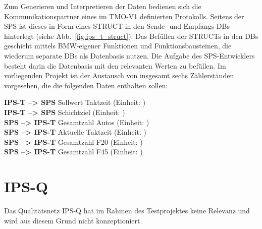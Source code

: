 Zum Generieren und Interpretieren der Daten bedienen sich die Kommunikationspartner eines im TMO-V1 definierten Protokolls. Seitens der SPS ist dieses in Form eines STRUCT in den Sende- und Empfangs-DBs hinterlegt (siehe Abb.~\ref{fig:ips_t_struct}). Das Befüllen der STRUCTs in den DBs geschieht mittels BMW-eigener Funktionen und Funktionsbausteinen, die wiederum separate DBs als Datenbasis nutzen. Die Aufgabe des SPS-Entwicklers besteht darin die Datenbasis mit den relevanten Werten zu befüllen. Im vorliegenden Projekt ist der Austausch von insgesamt sechs Zählerständen vorgesehen, die die folgenden Daten enthalten sollen:

\begin{tabbing}
    \textbf{IPS-T}    \= \textbf{--> SPS}   \hspace{.5cm}\= Sollwert Taktzeit (Einheit: ) \\
    \textbf{IPS-T}    \> \textbf{--> SPS}   \> Schichtziel (Einheit: \einh{}{\cars}) \\
    \textbf{SPS  }    \> \textbf{--> IPS-T} \> Gesamtzahl Autos (Einheit: \einh{}{\cars})\\
    \textbf{SPS  }    \> \textbf{--> IPS-T} \> Aktuelle Taktzeit (Einheit: )\\
    \textbf{SPS  }    \> \textbf{--> IPS-T} \> Gesamtzahl F20 (Einheit: \einh{}{\cars})\\
    \textbf{SPS  }    \> \textbf{--> IPS-T} \> Gesamtzahl F45 (Einheit: \einh{}{\cars})
\end{tabbing}







\section{IPS-Q}
\label{sec:ips_q}

Das Qualitätsnetz IPS-Q hat im Rahmen des Testprojektes keine Relevanz und wird aus diesem Grund nicht konzeptioniert.